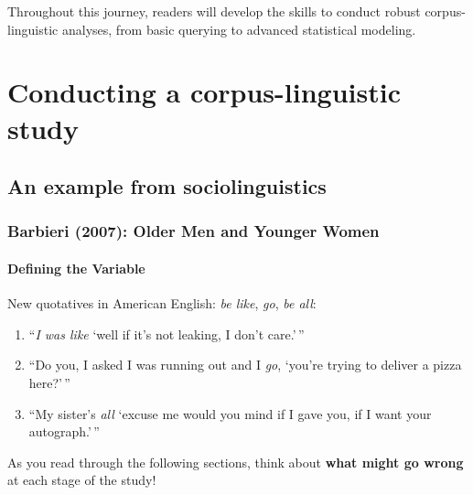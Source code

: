 \documentclass[
  11pt,
  letterpaper,
  DIV=11,
  numbers=noendperiod]{scrreprt}
\providecommand{\tightlist}{%
  \setlength{\itemsep}{0pt}\setlength{\parskip}{0pt}}\usepackage{longtable,booktabs,array}
\begin{document}
Throughout this journey, readers will develop the skills to conduct
robust corpus-linguistic analyses, from basic querying to advanced
statistical modeling.

\part{Conducting a corpus-linguistic study}

\chapter{An example from
sociolinguistics}\label{an-example-from-sociolinguistics}

\section{Barbieri (2007): Older Men and Younger
Women}\label{barbierioldermenyounger2007-older-men-and-younger-women}

\subsection{Defining the Variable}\label{defining-the-variable}

New quotatives in American English: \emph{be like}, \emph{go}, \emph{be
all}:

\begin{enumerate}
\def\labelenumi{(\arabic{enumi})}
\tightlist
\item
  ``\emph{I was like} `well if it's not leaking, I don't care.'\,''
\item
  ``Do you, I asked I was running out and I \emph{go}, `you're trying to
  deliver a pizza here?'\,''
\item
  ``My sister's \emph{all} `excuse me would you mind if I gave you, if I
  want your autograph.'\,''
\end{enumerate}

\begin{tcolorbox}[enhanced jigsaw, toprule=.15mm, opacitybacktitle=0.6, coltitle=black, arc=.35mm, colback=white, title=\textcolor{quarto-callout-caution-color}{\faFire}\hspace{0.5em}{Task}, titlerule=0mm, toptitle=1mm, bottomtitle=1mm, breakable, rightrule=.15mm, opacityback=0, bottomrule=.15mm, leftrule=.75mm, colframe=quarto-callout-caution-color-frame, left=2mm, colbacktitle=quarto-callout-caution-color!10!white]

As you read through the following sections, think about \textbf{what
might go wrong} at each stage of the study!

\end{tcolorbox}
\end{document}
